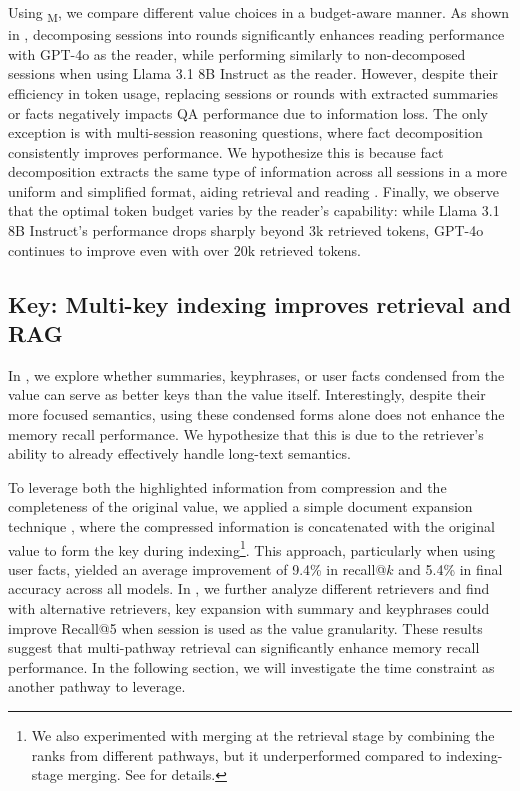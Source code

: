 Using \BENCHMARK\textsubscript{\textsc{M}}, we compare different value choices in a budget-aware manner. As shown in , decomposing sessions into rounds significantly enhances reading performance with GPT-4o as the reader, while performing similarly to non-decomposed sessions when using Llama 3.1 8B Instruct as the reader. However, despite their efficiency in token usage, replacing sessions or rounds with extracted summaries or facts negatively impacts QA performance due to information loss. The only exception is with multi-session reasoning questions, where fact decomposition consistently improves performance. We hypothesize this is because fact decomposition extracts the same type of information across all sessions in a more uniform and simplified format, aiding retrieval and reading \citep{DBLP:journals/corr/abs-2312-06648}. Finally, we observe that the optimal token budget varies by the reader's capability: while Llama 3.1 8B Instruct's performance drops sharply beyond 3k retrieved tokens, GPT-4o continues to improve even with over 20k retrieved tokens.



\subsection{Key: Multi-key indexing improves retrieval and RAG}
\label{section-key-results}

In , we explore whether summaries, keyphrases, or user facts condensed from the value can serve as better keys than the value itself. Interestingly, despite their more focused semantics, using these condensed forms alone does not enhance the memory recall performance. We hypothesize that this is due to the retriever's ability to already effectively handle long-text semantics. 


To leverage both the highlighted information from compression and the completeness of the original value, we applied a simple document expansion technique \citep{tao-etal-2006-language, DBLP:conf/sigir/EfronOF12}, where the compressed information is concatenated with the original value to form the key during indexing\footnote{We also experimented with merging at the retrieval stage by combining the ranks from different pathways, but it underperformed compared to indexing-stage merging. See  for details.}. This approach, particularly when using user facts, {yielded an average improvement of 9.4\% in recall@$k$ and 5.4\% in final accuracy across all models.} In , we further analyze different retrievers and find with alternative retrievers, key expansion with summary and keyphrases could improve Recall@5 when session is used as the value granularity. These results suggest that multi-pathway retrieval can significantly enhance memory recall performance. In the following section, we will investigate the time constraint as another pathway to leverage.



